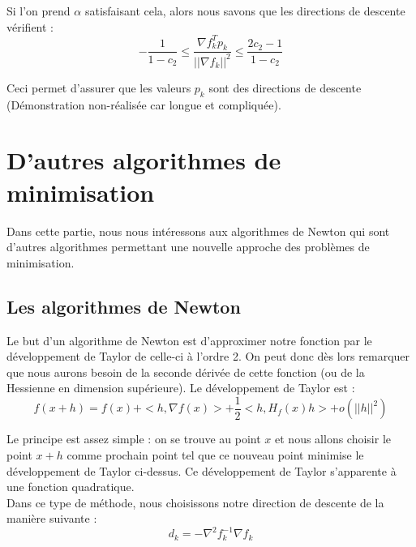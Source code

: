 Si l'on prend $\alpha$ satisfaisant cela, alors nous savons que les directions de descente vérifient : 
\begin{equation}
-\frac{1}{1 - c_2}\leq \frac{\nabla f_k^Tp_k}{||\nabla f_k||^2} \leq \frac{2c_2 - 1}{1 - c_2}
\end{equation}

Ceci permet d'assurer que les valeurs $p_k$ sont des directions de descente (Démonstration non-réalisée car longue et compliquée).
\section{D'autres algorithmes de minimisation}
Dans cette partie, nous nous intéressons aux algorithmes de Newton qui sont d'autres algorithmes permettant une nouvelle approche des problèmes de minimisation.
\subsection{Les algorithmes de Newton}
Le but d'un algorithme de Newton est d'approximer notre fonction par le développement de Taylor de celle-ci à l'ordre 2. On peut donc dès lors remarquer que nous aurons besoin de la seconde dérivée de cette fonction (ou de la Hessienne en dimension supérieure). Le développement de Taylor est  : 
\begin{equation}
f(x+h) = f(x) + <h, \nabla f(x)> + \frac{1}{2} <h, H_f(x)h> + o(||h||^2)
\end{equation}

Le principe est assez simple : on se trouve au point $x$ et nous allons choisir le point $x+h$ comme prochain point tel que ce nouveau point minimise le développement de Taylor ci-dessus. Ce développement de Taylor s'apparente à une fonction quadratique.\\

Dans ce type de méthode, nous choisissons notre direction de descente de la manière suivante : 
\begin{equation}
d_k = -\nabla^2f_k^{-1}\nabla f_k
\end{equation}

